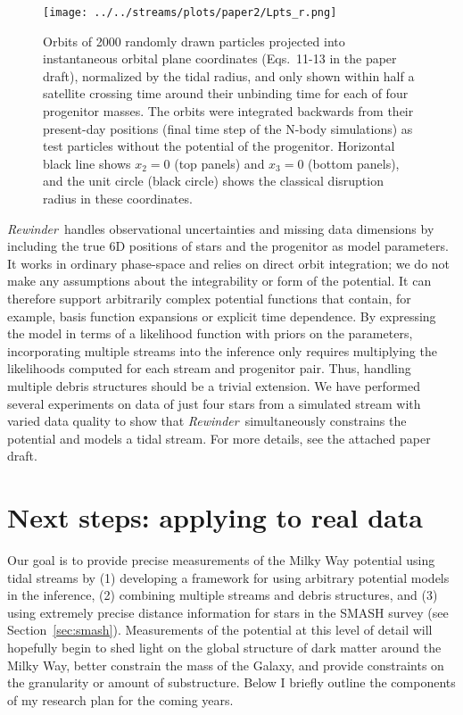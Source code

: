 \documentclass[letterpaper,12pt,preprint]{aastex}
\newcommand{\rewinder}{\emph{Rewinder}}
\begin{document}
\begin{figure}[h]
\begin{center}
\texttt{[image: ../../streams/plots/paper2/Lpts\_r.png]}
\caption{ Orbits of 2000 randomly drawn particles projected into instantaneous orbital plane coordinates (Eqs.~11-13 in the paper draft), normalized by the tidal radius, and only shown within half a satellite crossing time around their unbinding time for each of four progenitor masses. The orbits were integrated backwards from their present-day positions (final time step of the N-body simulations) as test particles without the potential of the progenitor. Horizontal black line shows $x_2=0$ (top panels) and $x_3=0$ (bottom panels), and the unit circle (black circle) shows the classical disruption radius in these coordinates. }\label{fig:lpts_r}
\end{center}
\end{figure}

\rewinder\ handles observational uncertainties and missing data dimensions by including the true 6D positions of stars and the progenitor as model parameters. It works in ordinary phase-space and relies on direct orbit integration; we do not make any assumptions about the integrability or form of the potential. It can therefore support arbitrarily complex potential functions that contain, for example, basis function expansions or explicit time dependence. By expressing the model in terms of a likelihood function with priors on the parameters, incorporating multiple streams into the inference only requires multiplying the likelihoods computed for each stream and progenitor pair. Thus, handling multiple debris structures should be a trivial extension. We have performed several experiments on data of just four stars from a simulated stream with varied data quality to show that \rewinder\ simultaneously constrains the potential and models a tidal stream. For more details, see the attached paper draft. 

\section{Next steps: applying to real data}

Our goal is to provide precise measurements of the Milky Way potential using tidal streams by (1) developing a framework for using arbitrary potential models in the inference, (2) combining multiple streams and debris structures, and (3) using extremely precise distance information for stars in the SMASH survey (see Section~\ref{sec:smash}). Measurements of the potential at this level of detail will hopefully begin to shed light on the global structure of dark matter around the Milky Way, better constrain the mass of the Galaxy, and provide constraints on the granularity or amount of substructure. Below I briefly outline the components of my research plan for the coming years.
\end{document}
